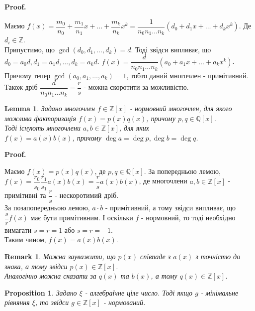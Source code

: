\documentclass[a4paper, 14pt]{extarticle}
\makeatletter
\theoremstyle{theoremdd}
\theoremstyle{theoremdd}
\theoremstyle{theoremdd}
\theoremstyle{theoremdd}
\theoremstyle{theoremdd}
\newtheorem{proposition}[theorem]{Proposition}
\theoremstyle{theoremdd}
\newtheorem{remark}[theorem]{Remark}
\theoremstyle{theoremdd}
\newtheorem{lemma}[theorem]{Lemma}
\theoremstyle{theoremdd}
\def\qed{$\blacksquare$}
\renewenvironment{proof}[1][Proof.\\]{\par
\pushQED{\hfill \qed}%
\normalfont \topsep6\p@\@plus6\p@\relax
\trivlist
\item\relax
{\bfseries
#1\@addpunct{.}}\hspace\labelsep\ignorespaces
}{%
\popQED\endtrivlist\@endpefalse
}
\makeatother
\begin{document}
\begin{proof}
Маємо $f(x) = \dfrac{m_0}{n_0} + \dfrac{m_1}{n_1}x + \dots + \dfrac{m_k}{n_k}x^k = \dfrac{1}{n_0n_1\dots n_k} \left( d_0 + d_1 x + \dots + d_kx^k \right)$.
Де $d_i \in \mathbb{Z}$.\\
Припустимо, що $\gcd(d_0,d_1,\dots,d_k) = d$. Тоді звідси випливає, що \\
$d_0 = a_0d, d_1 = a_1d, \dots, d_k = a_kd$.
$f(x) = \dfrac{d}{n_0n_1\dots n_k} (a_0 + a_1x+\dots+a_kx^k)$.\\
Причому тепер $\gcd(a_0,a_1,\dots,a_k) = 1$, тобто даний многочлен - примітивний.\\
Також дріб $\dfrac{d}{n_0n_1 \dots n_k} = \dfrac{r}{s}$ - можна скоротити за можливістю.
\end{proof}

\begin{lemma}
Задано многочлен $f \in \mathbb{Z}[x]$ - нормовний многочлен, для якого можлива факторизація $f(x) = p(x)q(x)$, причому $p,q \in \mathbb{Q}[x]$.\\
Тоді існують многочлени $a,b \in \mathbb{Z}[x]$, для яких \\
$f(x) = a(x)b(x)$, причому $\deg a = \deg p, \deg b = \deg q$.
\end{lemma}

\begin{proof}
Маємо $f(x) = p(x) q(x)$, де $p,q \in \mathbb{Q}[x]$. За попередньою лемою,\\
$f(x) = \dfrac{r_0}{s_0} \dfrac{r_1}{s_1} a(x)b(x) = \dfrac{r}{s} a(x)b(x)$, де многочлени $a,b \in \mathbb{Z}[x]$ - примітивні та $\dfrac{r}{s}$ - нескоротимий дріб.\\
За позапопередньою лемою, $a \cdot b$ - примітивний, а тому звідси випливає, що $\dfrac{s}{r}f(x)$ має бути примітивним. І оскільки $f$ - нормовний, то тоді необхідно вимагати $s = r = 1$ або $s = r = -1$.\\
Таким чином, $f(x) = a(x)b(x)$.
\end{proof}

\begin{remark}
Можна зауважити, що $p(x)$ співпаде з $a(x)$ з точністю до знака, а тому звідси $p(x) \in \mathbb{Z}[x]$.\\
Аналогічно можна сказати за $q(x)$ та $b(x)$, а тому $q(x) \in \mathbb{Z}[x]$.
\end{remark}

\begin{proposition}
Задано $\xi$ - алгебраїчне ціле число. Тоді якщо $g$ - мінімальне рівняння $\xi$, то звідси $g \in \mathbb{Z}[x]$ - нормований.
\end{proposition}
\end{document}
